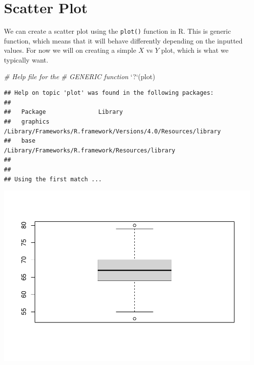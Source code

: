 \documentclass[
]{book}
\newenvironment{Shaded}{\begin{snugshade}}{\end{snugshade}}
\newcommand{\CommentTok}[1]{\textcolor[rgb]{0.56,0.35,0.01}{\textit{#1}}}
\newcommand{\DataTypeTok}[1]{\textcolor[rgb]{0.13,0.29,0.53}{#1}}
\newcommand{\KeywordTok}[1]{\textcolor[rgb]{0.13,0.29,0.53}{\textbf{#1}}}
\newcommand{\NormalTok}[1]{#1}
\newcommand{\OperatorTok}[1]{\textcolor[rgb]{0.81,0.36,0.00}{\textbf{#1}}}
\newcommand{\StringTok}[1]{\textcolor[rgb]{0.31,0.60,0.02}{#1}}
\begin{document}
\hypertarget{scatter-plot}{%
\section{Scatter Plot}\label{scatter-plot}}

We can create a scatter plot using the \texttt{plot()} function in R. This is generic function, which means that it will behave differently depending on the inputted values. For now we will on creating a simple \(X\) vs \(Y\) plot, which is what we typically want.

\begin{Shaded}
\begin{Highlighting}[]
\CommentTok{# Help file for the}
\CommentTok{# GENERIC function}
\StringTok{`}\DataTypeTok{?}\StringTok{`}\NormalTok{(plot)}
\end{Highlighting}
\end{Shaded}

\begin{verbatim}
## Help on topic 'plot' was found in the following packages:
## 
##   Package               Library
##   graphics              /Library/Frameworks/R.framework/Versions/4.0/Resources/library
##   base                  /Library/Frameworks/R.framework/Resources/library
## 
## 
## Using the first match ...
\end{verbatim}

\begin{Shaded}
\end{Shaded}

\includegraphics{_main_files/figure-latex/unnamed-chunk-177-1.pdf}
\end{document}
